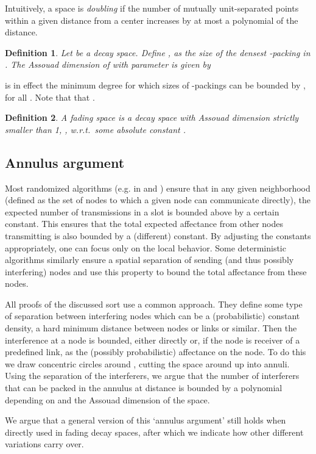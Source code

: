 \documentclass[11pt]{amsart}
\newtheorem{definition}{Definition}[section]
\newcommand{\define}[1]{\emph{#1}} \newcommand{\degree}{^\circ}
\begin{document}
Intuitively, a space is \emph{doubling} if the number of mutually unit-separated points 
within a given distance from a center increases by at most a polynomial of the distance.

\begin{definition}
Let  be a decay space.
Define , as the size of the densest -packing in .
The \define{Assouad dimension  of  with parameter } is
given by
  
\end{definition}
 is in effect the minimum degree  for which sizes of
-packings can be bounded by , for all .
Note that that  \cite{Heinonen}.


\begin{definition}
A \emph{fading space} is a decay space  with Assouad dimension
strictly smaller than 1, , w.r.t.\ some absolute constant .
\end{definition}

\subsection{Annulus argument}
Most randomized algorithms (e.g. in \cite{PODC13} and \cite{Yu12}) ensure that in any given neighborhood
(defined as the set of nodes to which a given node can communicate directly),
the expected number of transmissions in a slot is bounded above by a certain constant.
This ensures that the total expected affectance from other nodes transmitting
is also bounded by a (different) constant.
By adjusting the constants appropriately, one can focus only on the local behavior.
Some deterministic algorithms similarly ensure a spatial separation of sending (and thus possibly interfering) nodes and use this property to bound the total affectance from these nodes.

All proofs of the discussed sort use a common approach.  They define
some type of separation between interfering nodes which can be a
(probabilistic) constant density, a hard minimum distance between
nodes or links or similar.  Then the interference at a node  is
bounded, either directly or, if the node is receiver of a
predefined link, as the (possibly probabilistic) affectance on the
node.  To do this we draw concentric circles around , cutting the
space around  up into annuli.  Using the separation of the
interferers, we argue that the number of interferers that can be
packed in the annulus at distance  is bounded by a polynomial
depending on  and the Assouad dimension of the
space.  

We argue that a general version of this `annulus argument' still holds
when directly used in fading decay spaces, after which we indicate
how other different variations carry over.
\end{document}
